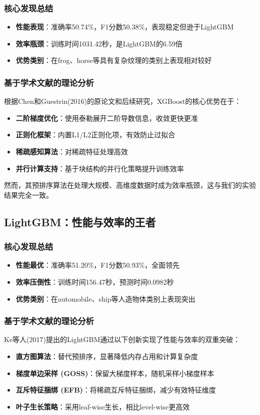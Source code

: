 \documentclass[UTF8]{report}
\theoremstyle{MyLineTheoremStyle} %
\theoremstyle{MyBlockTheoremStyle} %
\theoremstyle{MySubsubsectionStyle} %
\begin{document}
\subsubsection{核心发现总结}
\begin{itemize}
    \item \textbf{性能表现}：准确率50.74\%，F1分数50.38\%，表现稳定但逊于LightGBM
    \item \textbf{效率瓶颈}：训练时间1031.42秒，是LightGBM的6.59倍
    \item \textbf{优势类别}：在frog、horse等具有复杂纹理的类别上表现相对较好
\end{itemize}

\subsubsection{基于学术文献的理论分析}
根据Chen和Guestrin(2016)的原论文和后续研究，XGBoost的核心优势在于：
\begin{itemize}
    \item \textbf{二阶梯度优化}：使用泰勒展开二阶导数信息，收敛更快更准
    \item \textbf{正则化框架}：内置L1/L2正则化项，有效防止过拟合
    \item \textbf{稀疏感知算法}：对稀疏特征处理高效
    \item \textbf{并行计算支持}：基于块结构的并行化策略提升训练效率
\end{itemize}
然而，其预排序算法在处理大规模、高维度数据时成为效率瓶颈，这与我们的实验结果完全一致。

\subsection{LightGBM：性能与效率的王者}
\subsubsection{核心发现总结}
\begin{itemize}
    \item \textbf{性能最优}：准确率51.20\%，F1分数50.93\%，全面领先
    \item \textbf{效率压倒性}：训练时间156.47秒，预测时间0.0982秒
    \item \textbf{优势类别}：在automobile、ship等人造物体类别上表现突出
\end{itemize}

\subsubsection{基于学术文献的理论分析}
Ke等人(2017)提出的LightGBM通过以下创新实现了性能与效率的双重突破：
\begin{itemize}
    \item \textbf{直方图算法}：替代预排序，显著降低内存占用和计算复杂度
    \item \textbf{梯度单边采样 (GOSS)}：保留大梯度样本，随机采样小梯度样本
    \item \textbf{互斥特征捆绑 (EFB)}：将稀疏互斥特征捆绑，减少有效特征维度
    \item \textbf{叶子生长策略}：采用leaf-wise生长，相比level-wise更高效
\end{itemize}
\end{document}
